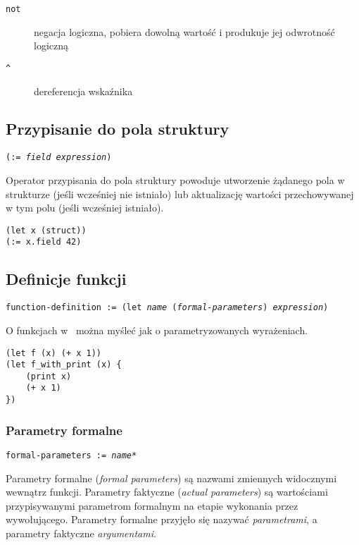 \begin{description}
    \item[\texttt{not}] negacja logiczna, pobiera dowolną wartość i produkuje jej odwrotność logiczną
    \item[\texttt{\^}] dereferencja wskaźnika
\end{description}

\subsection{Przypisanie do pola struktury}

\texttt{(:= \emph{field} \emph{expression})}
\vspace{1em}

Operator przypisania do pola struktury powoduje utworzenie żądanego pola w strukturze (jeśli wcześniej nie
istniało) lub aktualizację wartości przechowywanej w tym polu (jeśli wcześniej istniało).

\begin{lstlisting}
(let x (struct))
(:= x.field 42)
\end{lstlisting}

\subsection{Definicje funkcji}

\texttt{function-definition := (let \emph{name} (\emph{formal-parameters}) \emph{expression})}
\vspace{1em}

O funkcjach w \ViuAct\ można myśleć jak o parametryzowanych wyrażeniach.

\begin{lstlisting}
(let f (x) (+ x 1))
(let f_with_print (x) {
    (print x)
    (+ x 1)
})
\end{lstlisting}

\subsubsection{Parametry formalne}

\texttt{formal-parameters := \emph{name}*}
\vspace{1em}

Parametry formalne (\emph{formal parameters}) są nazwami zmiennych widocznymi
wewnątrz funkcji. Parametry faktyczne (\emph{actual parameters}) są wartościami
przypisywanymi parametrom formalnym na etapie wykonania przez wywołującego.
Parametry formalne przyjęło się nazywać \emph{parametrami}, a parametry
faktyczne \emph{argumentami}.


